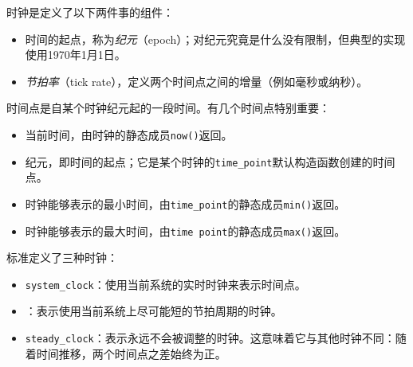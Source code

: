 
时钟是定义了以下两件事的组件：



\begin{itemize}
\item 时间的起点，称为\textit{纪元}（epoch）；对纪元究竟是什么没有限制，但典型的实现使用1970年1月1日。



\item \textit{节拍率}（tick rate），定义两个时间点之间的增量（例如毫秒或纳秒）。

\end{itemize}



时间点是自某个时钟纪元起的一段时间。有几个时间点特别重要：



\begin{itemize}
\item 当前时间，由时钟的静态成员\texttt{now()}返回。



\item 纪元，即时间的起点；它是某个时钟的\texttt{time\_\allowbreak{}point}默认构造函数创建的时间点。



\item 时钟能够表示的最小时间，由\texttt{time\_\allowbreak{}point}的静态成员\texttt{min()}返回。



\item 时钟能够表示的最大时间，由\texttt{time point}的静态成员\texttt{max()}返回。

\end{itemize}



标准定义了三种时钟：



\begin{itemize}
\item \texttt{system\_\allowbreak{}clock}：使用当前系统的实时时钟来表示时间点。



\item {}：表示使用当前系统上尽可能短的节拍周期的时钟。



\item \texttt{steady\_\allowbreak{}clock}：表示永远不会被调整的时钟。这意味着它与其他时钟不同：随着时间推移，两个时间点之差始终为正。

\end{itemize}


